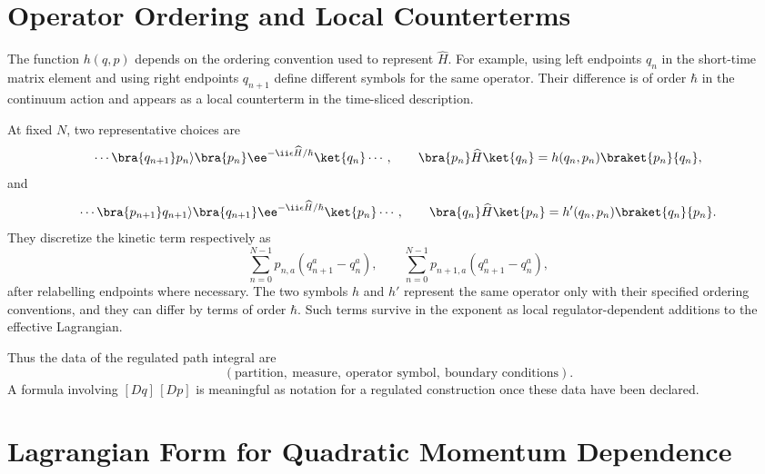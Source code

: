 \section{Operator Ordering and Local Counterterms}

\begin{definition}
\label{def:regulated-phase-space-path-integral-datum}
The function \(h(q,p)\) depends on the ordering convention used to represent
\(\widehat H\). For example, using left endpoints \(q_n\) in the short-time
matrix element and using right endpoints \(q_{n+1}\) define different symbols
for the same operator. Their difference is of order \(\hbar\) in the
continuum action and appears as a local counterterm in the time-sliced
description.

At fixed \(N\), two representative choices are
\[
  \cdots
  \bra{q_{n+1}}p_n\rangle
  \bra{p_n}\ee^{-\ii\epsilon\widehat H/\hbar}\ket{q_n}
  \cdots,
  \qquad
  \bra{p_n}\widehat H\ket{q_n}
  =
  h(q_n,p_n)\braket{p_n}{q_n},
\]
and
\[
  \cdots
  \bra{p_{n+1}}q_{n+1}\rangle
  \bra{q_{n+1}}\ee^{-\ii\epsilon\widehat H/\hbar}\ket{p_n}
  \cdots,
  \qquad
  \bra{q_n}\widehat H\ket{p_n}
  =
  h'(q_n,p_n)\braket{q_n}{p_n}.
\]
They discretize the kinetic term respectively as
\[
  \sum_{n=0}^{N-1}p_{n,a}(q_{n+1}^a-q_n^a),
  \qquad
  \sum_{n=0}^{N-1}p_{n+1,a}(q_{n+1}^a-q_n^a),
\]
after relabelling endpoints where necessary.  The two symbols \(h\) and
\(h'\) represent the same operator only with their specified ordering
conventions, and they can differ by terms of order \(\hbar\).  Such terms
survive in the exponent as local regulator-dependent additions to the
effective Lagrangian.

Thus the data of the regulated path integral are
\[
  (\text{partition},\ \text{measure},\ \text{operator symbol},\
  \text{boundary conditions}).
\]
A formula involving \([Dq]\,[Dp]\) is meaningful as notation for a regulated
construction once these data have been declared.
\end{definition}

\section{Lagrangian Form for Quadratic Momentum Dependence}


